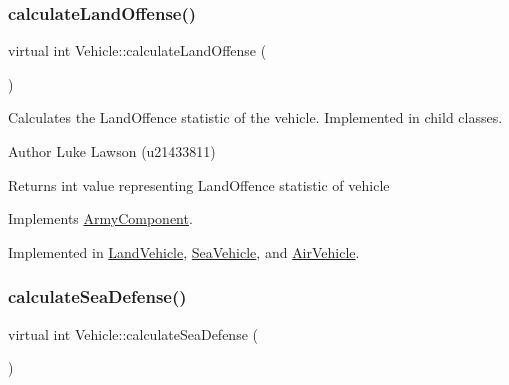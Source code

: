 \mbox{\label{class_vehicle_a6b272c05209a8907ebe6229e66317f4a}} 
\subsubsection{\texorpdfstring{calculateLandOffense()}{calculateLandOffense()}}
{\footnotesize\ttfamily virtual int Vehicle\+::calculate\+Land\+Offense (\begin{DoxyParamCaption}{ }\end{DoxyParamCaption})\hspace{0.3cm}{\ttfamily [pure virtual]}}



Calculates the Land\+Offence statistic of the vehicle. Implemented in child classes. 

\begin{DoxyAuthor}{Author}
Luke Lawson (u21433811) 
\end{DoxyAuthor}
\begin{DoxyReturn}{Returns}
int value representing Land\+Offence statistic of vehicle 
\end{DoxyReturn}


Implements \mbox{\hyperlink{class_army_component_a0556ff6dbfa956f9ab52aadaa6a331e1}{Army\+Component}}.



Implemented in \mbox{\hyperlink{class_land_vehicle_ae8604789808fddcd4e58122c11ee18cd}{Land\+Vehicle}}, \mbox{\hyperlink{class_sea_vehicle_a6a07126cd3e346097f967e3a8038622f}{Sea\+Vehicle}}, and \mbox{\hyperlink{class_air_vehicle_afbbfd8dd22d786ca679669f2ae5f9f41}{Air\+Vehicle}}.

\mbox{\label{class_vehicle_a20e871b1ff13d47f4c875c987ed68add}} 
\subsubsection{\texorpdfstring{calculateSeaDefense()}{calculateSeaDefense()}}
{\footnotesize\ttfamily virtual int Vehicle\+::calculate\+Sea\+Defense (\begin{DoxyParamCaption}{ }\end{DoxyParamCaption})\hspace{0.3cm}{\ttfamily [pure virtual]}}



